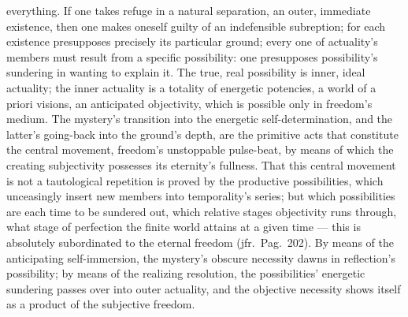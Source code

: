 \documentclass[12pt]{book}
\begin{document}
everything. If one takes refuge in a natural separation, an outer, immediate
existence, then one makes oneself guilty of an indefensible subreption; for
each existence presupposes precisely its particular ground; every one of
actuality's members must result from a specific possibility: one
presupposes possibility's sundering in wanting to explain it. The true, real
possibility is inner, ideal actuality; the inner actuality is a totality of
energetic potencies, a world of a priori visions, an anticipated
objectivity, which is possible only in freedom's medium. The mystery's
transition into the energetic self-determination, and the latter's
going-back into the ground's depth, are the primitive acts that constitute
the central movement, freedom's unstoppable pulse-beat, by means of which
the creating subjectivity possesses its eternity's fullness. That this
central movement is not a tautological repetition is proved by the
productive possibilities, which unceasingly insert new members into
temporality's series; but which possibilities are each time to be sundered
out, which relative stages objectivity runs through, what stage of
perfection the finite world attains at a given time --- this is absolutely
subordinated to the eternal freedom (jfr.\ Pag.\ 202). By means of the
anticipating self-immersion, the mystery's obscure necessity dawns in
reflection's possibility; by means of the realizing resolution, the
possibilities' energetic sundering passes over into outer actuality, and the
objective necessity shows itself as a product of the subjective freedom.
\end{document}

